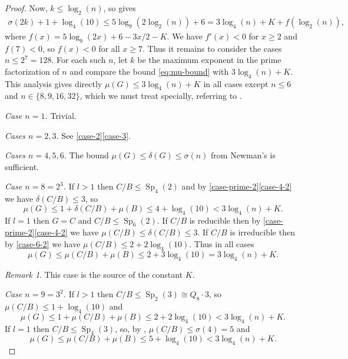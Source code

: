 \documentclass[11pt,reqno]{amsart}
\numberwithin{equation}{section}
\theoremstyle{definition}
\theoremstyle{remark}
\newtheorem*{remark}{Remark}
\newcommand\opr[1]{\operatorname{#1}}
\def\Sp{\opr{Sp}}
\numberwithin{equation}{section}
\begin{document}
\begin{proof}
    Now, $k \le \log_2(n)$, so  gives
    \begin{align*}
        \sigma(2k) + 1 + \log_4(10) \le 5 \log_9(2\log_2(n)) + 6
        = 3 \log_4(n) + K + f(\log_2(n)),
    \end{align*}
    where $f(x) = 5 \log_9(2 x) + 6 - 3x/2 - K$.
    We have $f'(x) < 0$ for $x \ge 2$ and $f(7) < 0$, so $f(x) < 0$ for all $x \ge 7$.
    Thus it remains to consider the cases $n \le 2^7 = 128$.
    For each such $n$, let $k$ be the maximum exponent in the prime factorization of $n$ and compare the bound \eqref{eq:mu-bound} with $3 \log_4(n) + K$.
    This analysis gives directly $\mu(G) \le 3 \log_4(n) + K$ in all cases except $n \le 6$ and $n \in \{8, 9, 16, 32\}$, which we must treat specially,
    referring to .

    \emph{Case $n = 1$.}
    Trivial.

    \emph{Cases $n = 2, 3$.}
    See \ref{case-2}\ref{case-3}.

    \emph{Cases $n = 4, 5, 6$.}
    The bound $\mu(G) \le \delta(G) \le \sigma(n)$ from Newman's  is sufficient.

    \emph{Case $n = 8 = 2^3$.}
    If $l > 1$ then $C / B \le \Sp_4(2)$ and by \ref{case-prime-2}\ref{case-4-2} we have $\delta(C / B) \le 3$, so
    \[
        \mu(G) \le 1 + \delta(C / B) + \mu(B) \le 4 + \log_4(10)
        < 3 \log_4(n) + K.
    \]
    If $l = 1$ then $G = C$ and $C / B \le \Sp_6(2)$.
    If $C / B$ is reducible then by \ref{case-prime-2}\ref{case-4-2} we have $\mu(C/B) \le \delta(C / B) \le 3$.
    If $C / B$ is irreducible then by \ref{case-6-2} we have $\mu(C / B) \le 2 + 2 \log_4(10)$.
    Thus in all cases
    \[
        \mu(G) \le \mu(C / B) + \mu(B) \le 2 + 3 \log_4(10) = 3 \log_4(n) + K.
    \]

    \begin{remark}
    This case is the source of the constant $K$.
    \end{remark}

    \emph{Case $n = 9 = 3^2$.}
    If $l > 1$ then $C / B \le \Sp_2(3) \cong Q_8 \cdot 3$, so $\mu(C / B) \le 1 + \log_4(10)$ and
    \[
        \mu(G) \le 1 + \mu(C / B) + \mu(B) \le 2 + 2 \log_4(10)
        < 3 \log_4(n) + K.
    \]
    If $l = 1$ then $C / B \le \Sp_4(3)$, so, by , $\mu(C / B) \le \sigma(4) = 5$ and
    \[
        \mu(G) \le \mu(C / B) + \mu(B) \le 5 + \log_4(10)
        < 3 \log_4(n) + K.
    \]


\end{proof}
\end{document}
